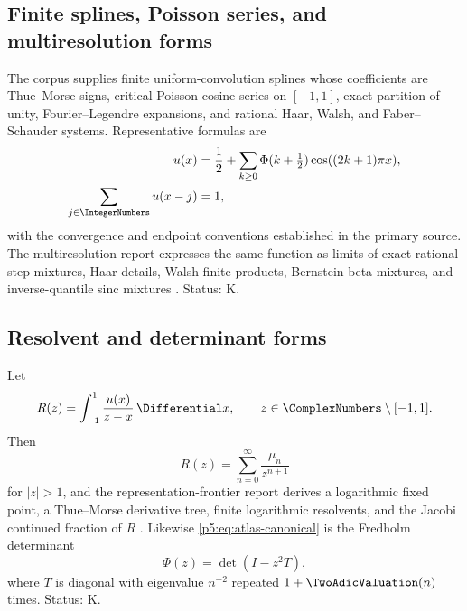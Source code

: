 \documentclass[11pt]{article}
\theoremstyle{definition}
\theoremstyle{remark}
\newcommand{\statusknown}{\textsf{K}}
\begin{document}
\subsection{Finite splines, Poisson series, and multiresolution forms}

The corpus supplies finite uniform-convolution splines whose coefficients are
Thue--Morse signs, critical Poisson cosine series on $[-1,1]$, exact partition
of unity, Fourier--Legendre expansions, and rational Haar, Walsh, and
Faber--Schauder systems.  Representative formulas are
\begin{align}
 u(x)&=\frac12+\sum_{k\ge0}\Phi(k+\tfrac12)
                 \cos((2k+1)\pi x),                       \label{p5:eq:critical-cosine}\\
 \sum_{j\in\IntegerNumbers}u(x-j)&=1,                                  \label{p5:eq:partition-unity}
\end{align}
with the convergence and endpoint conventions established in the primary
source.  The multiresolution report expresses the same function as limits of
exact rational step mixtures, Haar details, Walsh finite products, Bernstein
beta mixtures, and inverse-quantile sinc mixtures \cite{p5:repoMultiresolution}.
Status: \statusknown.

\subsection{Resolvent and determinant forms}

Let
\begin{equation}
 R(z)=\int_{-1}^{1}\frac{u(x)}{z-x}\,\Differential x,
 \qquad z\in\ComplexNumbers\setminus[-1,1].                             \label{p5:eq:Cauchy-transform}
\end{equation}
Then
\begin{equation}
 R(z)=\sum_{n=0}^{\infty}\frac{\mu_n}{z^{n+1}}             \label{p5:eq:R-moment-series}
\end{equation}
for $|z|>1$, and the representation-frontier report derives a logarithmic
fixed point, a Thue--Morse derivative tree, finite logarithmic resolvents, and
the Jacobi continued fraction of $R$ \cite{p5:repoRepresentations}.  Likewise
\eqref{p5:eq:atlas-canonical} is the Fredholm determinant
\begin{equation}
 \Phi(z)=\det(I-z^2T),                                     \label{p5:eq:Fredholm}
\end{equation}
where $T$ is diagonal with eigenvalue $n^{-2}$ repeated $1+\TwoAdicValuation(n)$ times.
Status: \statusknown.
\end{document}
